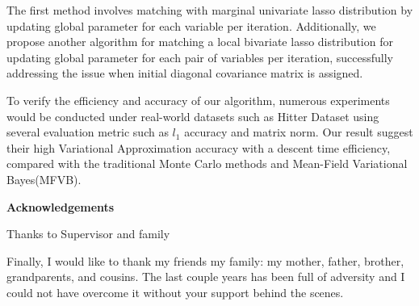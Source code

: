 The first method involves matching with marginal univariate lasso distribution by updating global parameter for each variable per iteration. Additionally, we propose another algorithm for matching a local bivariate lasso distribution for updating global parameter for each pair of variables per iteration, successfully addressing the issue when initial diagonal covariance matrix is assigned.

To verify the efficiency and accuracy of our algorithm, numerous experiments would be conducted under real-world datasets such as Hitter Dataset using several evaluation metric such as $l_1$ accuracy and matrix norm.
Our result suggest their high Variational Approximation accuracy with a descent time efficiency, compared with the traditional Monte Carlo methods and Mean-Field Variational Bayes(MFVB).


\newpage

\begin{center}
    \textbf{\large Acknowledgements}\\
    \vspace{0.5cm}
\end{center}
   Thanks to Supervisor and family 

   Finally, I would like to thank my friends  my family: my mother, father, brother, grandparents, and cousins. The last couple years has been full of adversity and I could not have overcome it without your support behind the scenes.
   
\vfill
\hspace{0pt}
\pagebreak
\newpage